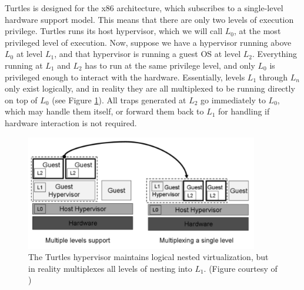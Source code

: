 \documentclass[letterpaper, twocolumn]{article}
\begin{document}
Turtles is designed for the x86 architecture, which subscribes to a
single-level hardware support model.  This means that there are only two
levels of execution privilege.  Turtles runs its host hypervisor, which
we will call $L_0$, at the most privileged level of execution.  Now, suppose
we have a hypervisor running above $L_0$ at level $L_1$, and that hypervisor
is running a guest OS at level $L_2$.  Everything running at $L_1$ and $L_2$
has to run at the same privilege level, and only $L_0$ is privileged enough
to interact with the hardware.  Essentially, levels $L_1$ through $L_n$ only
exist logically, and in reality they are all multiplexed to be running directly
on top of $L_0$ (see Figure \ref{fig:turtles-multiplex}).  All traps generated at
$L_2$ go immediately to $L_0$, which
may handle them itself, or forward them back to $L_1$ for handling if hardware
interaction is not required.

\begin{figure}[t]
	\begin{center}
		\includegraphics[width=4in]{images/turtles.png}
	\end{center}
	\caption{The Turtles hypervisor maintains logical nested virtualization, but
		in reality multiplexes all levels of nesting into $L_1$. (Figure courtesy
		of \cite{ref:turtles})}
	\label{fig:turtles-multiplex}
\end{figure}
\end{document}
